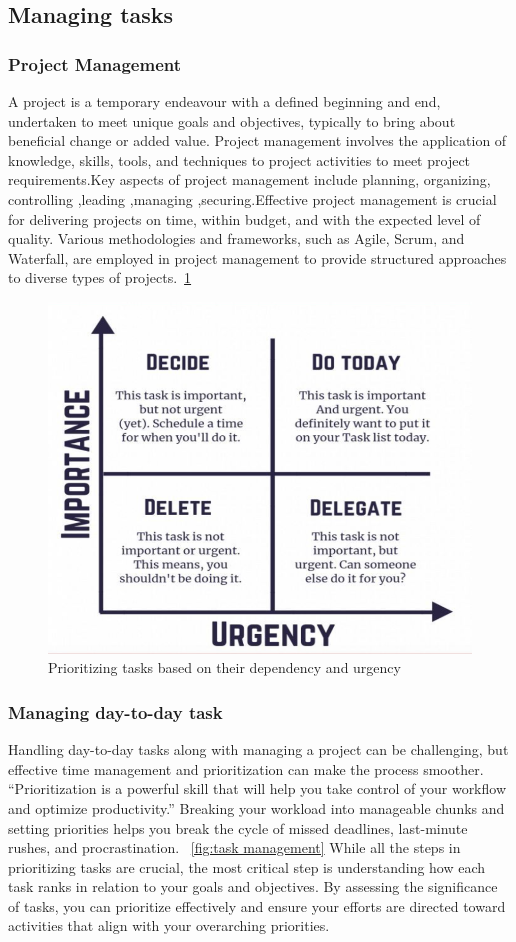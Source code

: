 \documentclass{chart}
\begin{document}
\subsection{Managing  tasks} 

\subsubsection{Project Management}
A project is a temporary endeavour with a defined beginning and end, undertaken to meet unique goals and objectives, typically to bring about beneficial change or added value. Project management involves the application of knowledge, skills, tools, and techniques to project activities to meet project requirements.Key aspects of project management include planning, organizing, controlling ,leading ,managing ,securing.Effective project management is crucial for delivering projects on time, within budget, and with the expected level of quality. Various methodologies and frameworks, such as Agile, Scrum, and Waterfall, are employed in project management to provide structured approaches to diverse types of projects.~\cref{fig:project management} 
 
\begin{figure}
	\centering
	\includegraphics[width=0.45\linewidth]{Fig1}
	\caption{Prioritizing tasks based on their dependency and urgency} 
	\label{fig:project management}
\end{figure}

\subsubsection{ Managing day-to-day task}
Handling day-to-day tasks along with managing a project can be challenging, but effective time management and prioritization can make the process smoother. “Prioritization is a powerful skill that will help you take control of your workflow and optimize productivity.” Breaking your workload into manageable chunks and setting priorities helps you break the cycle of missed deadlines, last-minute rushes, and procrastination. ~\cref{fig:task management} While all the steps in prioritizing tasks are crucial, the most critical step is understanding how each task ranks in relation to your goals and objectives. By assessing the significance of tasks, you can prioritize effectively and ensure your efforts are directed toward activities that align with your overarching priorities.
 
\end{document}
